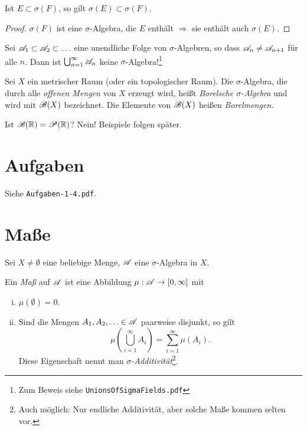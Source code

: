 \begin{lem}
 Ist $E \subset \sigma(F)$, so gilt $\sigma(E) \subset \sigma(F)$.
\end{lem}

\begin{proof}
 $\sigma(F)$ ist eine $\sigma$-Algebra, die $E$ enthält $\Rightarrow$ sie enthält auch $\sigma(E)$.
\end{proof}

\begin{rmrk}
 Sei $\mathscr{A}_1 \subset \mathscr{A}_2 \subset \ldots$ eine unendliche Folge von $\sigma$-Algebren, so dass $\mathscr{A}_n \ne \mathscr{A}_{n+1}$ für alle $n$. Dann ist $\bigcup_{n=1}^{\infty} \mathscr{A}_n$ keine $\sigma$-Algebra!\footnote{Zum Beweis siehe \texttt{UnionsOfSigmaFields.pdf}}
\end{rmrk}

\begin{defn}
 Sei $X$ ein metrischer Raum (oder ein topologischer Raum). Die $\sigma$-Algebra, die durch alle \emph{offenen Mengen} von $X$ erzeugt wird, heißt \emph{Borelsche $\sigma$-Algebra} und wird mit $\mathscr{B}(X)$ bezeichnet. Die Elemente von $\mathscr{B}(X)$ heißen \emph{Borelmengen}.
\end{defn}

Ist $\mathscr{B}(\mathbb{R}) = \mathscr{P}(\mathbb{R})$? Nein! Beispiele folgen später.

\section{Aufgaben}
Siehe \verb+Aufgaben-1-4.pdf+.

\section{Maße}
Sei $X \ne \emptyset$ eine beliebige Menge, $\mathscr{A}$ eine $\sigma$-Algebra in $X$.

\begin{defn}
 Ein \emph{Maß} auf $\mathscr{A}$ ist eine Abbildung $\mu: \mathscr{A} \to [0,\infty]$ mit
 \begin{enumerate}[(i)]
  \item $\mu( \emptyset ) = 0$.
  \item Sind die Mengen $A_1, A_2, \ldots \in \mathscr{A}$ paarweise disjunkt, so gilt
  \[ \mu\left( \bigcup_{i=1}^\infty A_i \right) = \sum_{i=1}^\infty \mu(A_i). \]
  Diese Eigenschaft nennt man \emph{$\sigma$-Additivität}\footnote{Auch möglich: Nur endliche Additivität, aber solche Maße kommen selten vor.}.
 \end{enumerate}
\end{defn}

